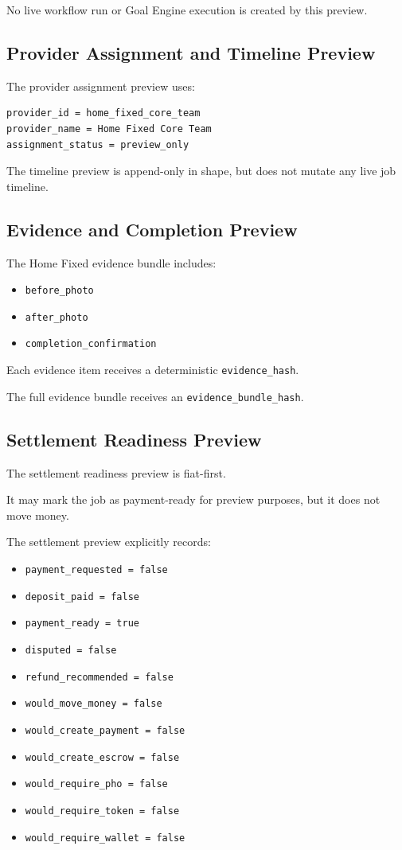 No live workflow run or Goal Engine execution is created by this preview.

\subsection{Provider Assignment and Timeline Preview}

The provider assignment preview uses:

\begin{verbatim}
provider_id = home_fixed_core_team
provider_name = Home Fixed Core Team
assignment_status = preview_only
\end{verbatim}

The timeline preview is append-only in shape, but does not mutate any live job timeline.

\subsection{Evidence and Completion Preview}

The Home Fixed evidence bundle includes:

\begin{itemize}
  \item \texttt{before\_photo}
  \item \texttt{after\_photo}
  \item \texttt{completion\_confirmation}
\end{itemize}

Each evidence item receives a deterministic \texttt{evidence\_hash}.

The full evidence bundle receives an \texttt{evidence\_bundle\_hash}.

\subsection{Settlement Readiness Preview}

The settlement readiness preview is fiat-first.

It may mark the job as payment-ready for preview purposes, but it does not move money.

The settlement preview explicitly records:

\begin{itemize}
  \item \texttt{payment\_requested = false}
  \item \texttt{deposit\_paid = false}
  \item \texttt{payment\_ready = true}
  \item \texttt{disputed = false}
  \item \texttt{refund\_recommended = false}
  \item \texttt{would\_move\_money = false}
  \item \texttt{would\_create\_payment = false}
  \item \texttt{would\_create\_escrow = false}
  \item \texttt{would\_require\_pho = false}
  \item \texttt{would\_require\_token = false}
  \item \texttt{would\_require\_wallet = false}
\end{itemize}

